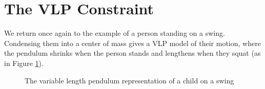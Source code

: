 \section{The VLP Constraint}
We return once again to the example of a person standing on a swing.
Condensing them into a center of mass gives a VLP model of their motion, where
the pendulum shrinks when the person stands and lengthens when they squat
(as in Figure \ref{fig:child-vlp}).
\begin{figure}
   \centering
   \begin{subfigure}[t]{0.5\textwidth}
   \end{subfigure}
   \begin{subfigure}[t]{0.5\textwidth}
   \end{subfigure}
   \caption{The variable length pendulum representation of a child on a
   swing}\label{fig:child-vlp}
\end{figure}

